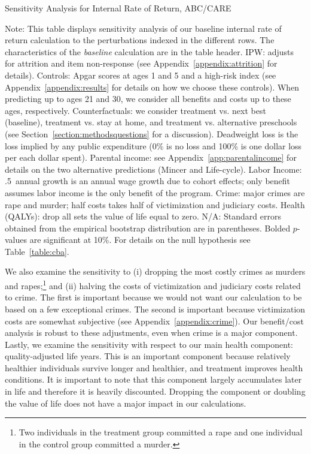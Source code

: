 \begin{table}
\begin{threeparttable}
\caption{Sensitivity Analysis for Internal Rate of Return, ABC/CARE}
\label{table:irrsens}
\centering
\footnotesize

\begin{tablenotes}
\footnotesize
\item Note: This table displays sensitivity analysis of our baseline internal rate of return calculation to the perturbations indexed in the different rows. The characteristics of the \textit{baseline} calculation are in the table header. IPW: adjusts for attrition and item non-response (see Appendix~\ref{appendix:attrition} for details). Controls: Apgar scores at ages 1 and 5 and a high-risk index (see Appendix~\ref{appendix:results} for details on how we choose these controls). When predicting up to ages 21 and 30, we consider all benefits and costs up to these ages, respectively. Counterfactuals: we consider treatment vs. next best (baseline), treatment vs. stay at home, and treatment vs. alternative preschools (see Section~\ref{section:methodsquestions} for a discussion). Deadweight loss is the loss implied by any public expenditure (0\% is no loss and 100\% is one dollar loss per each dollar spent). Parental income: see Appendix~\ref{app:parentalincome} for details on the two alternative predictions (Mincer and Life-cycle). Labor Income: .5\ annual growth is an annual wage growth due to cohort effects; only benefit assumes labor income is the only benefit of the program. Crime: major crimes are rape and murder; half costs takes half of victimization and judiciary costs. Health (QALYs): drop all sets the value of life equal to zero. N/A: Standard errors obtained from the empirical bootstrap distribution are in parentheses. Bolded $p$-values are significant at 10\%. For details on the null hypothesis see Table~\ref{table:cba}.
\end{tablenotes}
\end{threeparttable}
\end{table}
\restoregeometry
\doublespacing

We also examine the sensitivity to (i) dropping the most costly crimes as murders and rapes;\footnote{Two individuals in the treatment group committed a rape and one individual in the control group committed a murder.} and (ii) halving the costs of victimization and judiciary costs related to crime.  The first is important because we would not want our calculation to be based on a few exceptional crimes. The second is important because victimization costs are somewhat subjective (see Appendix~\ref{appendix:crime}). Our benefit/cost analysis is robust to these adjustments, even when crime is a major component. Lastly, we examine the sensitivity with respect to our main health component: quality-adjusted life years. This is an important component because relatively healthier individuals survive longer and healthier, and treatment improves health conditions. It is important to note that this component largely accumulates later in life and therefore it is heavily discounted. Dropping the component or doubling the value of life does not have a major impact in our calculations.

